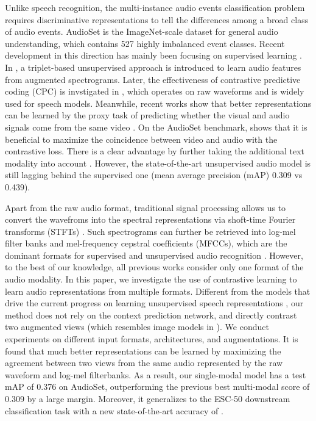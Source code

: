 \documentclass{article}
\begin{document}
Unlike speech recognition, the multi-instance audio events classification problem requires discriminative representations to tell the differences among a broad class of audio events. AudioSet \cite{gemmeke2017audio} is the ImageNet-scale dataset for general audio understanding, which contains 527 highly imbalanced event classes. Recent development in this direction has mainly been focusing on supervised learning \cite{hershey2017cnn, wang2019comparison, ford2019deep, kong2020panns}. 
In \cite{jansen2018unsupervised}, a triplet-based unsupervised approach is introduced to learn audio features from augmented spectrograms.
Later, the effectiveness of contrastive predictive coding (CPC) is invstigated in \cite{wang2020contrastive}, which operates on raw waveforms and is widely used for speech models.
Meanwhile, recent works show that better representations can be learned by the proxy task of predicting whether the visual and audio signals come from the same video \cite{arandjelovic2017look, arandjelovic2018objects, korbar2018cooperative, owens2018audio, jansen2019coincidence, alwassel2019self, alayrac2020self, morgado20avid, mandela2020datatrans}.
On the AudioSet benchmark, \cite{jansen2019coincidence} shows that it is beneficial to maximize the coincidence between video and audio with the contrastive loss. There is a clear advantage by further taking the additional text modality into account \cite{alayrac2020self}. However, the state-of-the-art unsupervised audio model is still lagging behind the supervised one \cite{kong2020panns} (mean average precision (mAP) 0.309 vs 0.439). 

Apart from the raw audio format, traditional signal processing allows us to convert the wavefroms into the spectral representations via shoft-time Fourier transforms (STFTs) \cite{jurafsky2008speech}. Such spectrograms can further be retrieved into log-mel filter banks and mel-frequency cepstral coefficients (MFCCs), which are the dominant formats for supervised and unsupervised audio recognition \cite{hershey2017cnn, wang2019comparison, ford2019deep, kong2020panns, jansen2018unsupervised, jansen2019coincidence}. However, to the best of our knowledge, all previous works consider only one format of the audio modality. In this paper, we investigate the use of contrastive learning to learn audio representations from multiple formats. Different from the models that drive the current progress on learning unsupervised speech representations \cite{schneider2019wav2vec, baevski2019vq, kawakami2020learning, riviere2020unsupervised, kahn2020libri, baevski2020wav2vec}, our method does not rely on the context prediction network, and directly contrast two augmented views (which resembles image models in \cite{he2020momentum, chen2020simple}). We conduct experiments on different input formats, architectures, and augmentations. It is found that much better representations can be learned by maximizing the agreement between two views from the same audio represented by the raw waveform and log-mel filterbanks. As a result, our single-modal model has a test mAP of 0.376 on AudioSet, outperforming the previous best multi-modal score of 0.309 \cite{alayrac2020self} by a large margin. Moreover, it generalizes to the ESC-50 downstream classification task with a new state-of-the-art accuracy of .
\end{document}
